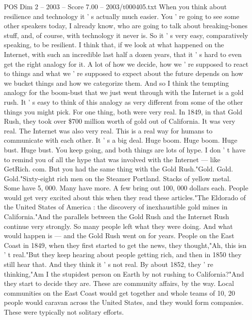 \begin{textsample}{POS Dim 2 – 2003 – Score 7.00 – 2003/t000405.txt}  \label{ex:f2_pos_079}
When you think about resilience and technology it ' s actually much easier.
You ' re going to see some other speakers today, I already know, who are going to talk about breaking-bones stuff, and, of course, with technology it never is.
So it ' s very easy, comparatively speaking, to be resilient.
I think that, if we look at what happened on the Internet, with such an incredible last half a dozen years, that it ' s hard to even get the right analogy for it.
A lot of how we decide, how we ' re supposed to react to things and what we ' re supposed to expect about the future depends on how we bucket things and how we categorize them.
And so I think the tempting analogy for the boom-bust that we just went through with the Internet is a gold rush.
It ' s easy to think of this analogy as very different from some of the other things you might pick.
For one thing, both were very real.
In 1849, in that Gold Rush, they took over \$700 million worth of gold out of California.
It was very real.
The Internet was also very real.
This is a real way for humans to communicate with each other.
It ' s a big deal.
Huge boom.
Huge boom.
Huge bust.
Huge bust.
You keep going, and both things are lots of hype.
I don ' t have to remind you of all the hype that was involved with the Internet — like GetRich. com.
But you had the same thing with the Gold Rush."Gold.
Gold.
Gold."Sixty-eight rich men on the Steamer Portland.
Stacks of yellow metal.
Some have 5, 000.
Many have more.
A few bring out 100, 000 dollars each.
People would get very excited about this when they read these articles."The Eldorado of the United States of America : the discovery of inexhaustible gold mines in California."And the parallels between the Gold Rush and the Internet Rush continue very strongly.
So many people left what they were doing.
And what would happen is — and the Gold Rush went on for years.
People on the East Coast in 1849, when they first started to get the news, they thought,"Ah, this isn ' t real."But they keep hearing about people getting rich, and then in 1850 they still hear that.
And they think it ' s not real.
By about 1852, they ' re thinking,"Am I the stupidest person on Earth by not rushing to California?"And they start to decide they are.
These are community affairs, by the way.
Local communities on the East Coast would get together and whole teams of 10, 20 people would caravan across the United States, and they would form companies.
These were typically not solitary efforts.

\end{textsample}
